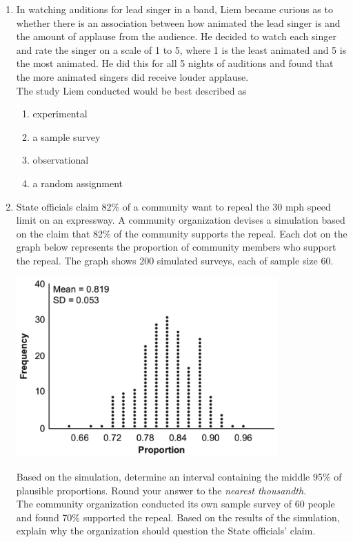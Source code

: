 \documentclass[12pt, twoside]{article}
\begin{document}
\begin{enumerate}
\newpage
\item In watching auditions for lead singer in a band, Liem became curious as to whether there is an association between how animated the lead singer is and the amount of applause from the audience. He decided to watch each singer and rate the singer on a scale of 1 to 5, where 1 is the least animated and 5 is the most animated. He did this for all 5 nights of auditions and found that the more animated singers did receive louder applause. \\[0.25cm]
The study Liem conducted would be best described as %
\begin{enumerate}
    \item experimental
    \item a sample survey
    \item observational
    \item a random assignment
\end{enumerate}

\item State officials claim 82\% of a community want to repeal the 30 mph speed limit on an expressway. A community organization devises a simulation based on the claim that 82\% of the community supports the repeal. Each dot on the graph below represents the proportion of community members who support the repeal. The graph shows 200 simulated surveys, each of sample size 60.
\begin{center}
    \includegraphics*[width=10cm]{../graphics/norm-36-Aug2022.png}
\end{center}
Based on the simulation, determine an interval containing the middle 95\% of plausible proportions. Round your answer to the \emph{nearest thousandth}. \\[5cm]
The community organization conducted its own sample survey of 60 people and found 70\% supported the repeal. Based on the results of the simulation, explain why the organization should question the State officials' claim. \vspace{3cm} %



\end{enumerate}
\end{document}
